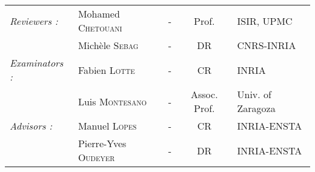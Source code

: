 \begin{titlepage}
\begin{center}
\begin{tabular}{llccl}
      \textit{Reviewers :}	    & Mohamed \textsc{Chetouani}   & - & Prof.         & ISIR, UPMC          \\
				                & Mich\`ele \textsc{Sebag}     & - & DR            & CNRS-INRIA               \\
      \textit{Examinators :}    & Fabien \textsc{Lotte}        & - & CR            & INRIA                     \\
      				            & Luis \textsc{Montesano}      & - & Assoc. Prof.  & Univ. of Zaragoza         \\
      \textit{Advisors :}       & Manuel \textsc{Lopes}        & - & CR            & INRIA-ENSTA               \\
                                & Pierre-Yves \textsc{Oudeyer} & - & DR            & INRIA-ENSTA          \\
\end{tabular}
\end{center}
\end{titlepage}
\sloppy

\titlepage
